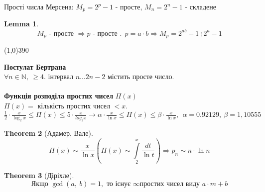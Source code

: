 \documentclass[a4paper,12pt]{bookest}
\newtheorem{theorem}{Theorem}[section]
\newtheorem{lemma}[theorem]{Lemma}
\begin{document}
\begin{example}
Прості числа Мерсена: $M_p=2^p-1$ - просте, $M_n=2^n-1$ - складене
\end{example}
\begin{lemma}
	$$M_p \textrm{ - просте }\Rightarrow p \textrm{ - просте }.\>\>p=a\cdot b\Rightarrow M_p=2^{ab}-1\>\vdots\>2^a-1$$
\end{lemma}
\begin{center}
	\line(1,0){390}
\end{center}
\textbf{Постулат Бертрана}\\
$\forall n\in\mathbb{N},\>\geq 4.$ інтервал $n\dots 2n-2$ містить просте число.
\\\\
\textbf{Функція розподіла простих чисел} $\Pi(x)$\\
$\Pi(x)=$ кількість простих чисел $<x.$\\
$\frac12\cdot \frac{x}{\log_2x}\leq \Pi(x)\leq 5\cdot\frac{x}{log_2x}\rightarrow \alpha\cdot\frac{x}{\ln x}\leq\Pi(x)\leq\beta\cdot\frac{x}{\ln x},\>\>\alpha=0.92129,\>\beta=1,10555$
\begin{theorem}[Адамер, Вале]
	$$\Pi(x)\sim \frac{x}{\ln x}(\Pi(x)\sim\int\limits_{2}^{x}\frac{dt}{\ln t})\Rightarrow p_n\sim n\cdot \ln n$$
\end{theorem}
\begin{theorem}[Діріхле]
	$$\textrm{Якщо } \gcd(a,\>b)=1, \textrm{ то існує }\infty\textrm{простих чисел виду }a\cdot m+b$$
\end{theorem}
\end{document}
